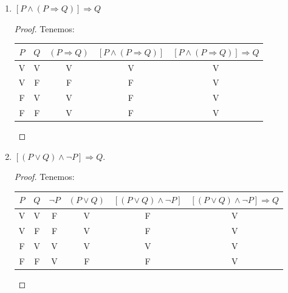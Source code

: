 \begin{problema}[Problema 4]
\begin{enumerate}
\begin{proof}
			\end{proof}
			\item $[P \wedge(P \Rightarrow Q)] \Rightarrow Q$
			\begin{proof}
				Tenemos: 
				
				\begin{table}[H]
					\centering
					\begin{tabular}{|c|c|c|c|c|}
						\hline
						$P$ & $Q$ & $(P \Rightarrow Q)$ & $[P \wedge(P \Rightarrow Q)] $ & $[P \wedge(P \Rightarrow Q)] \Rightarrow Q$ \\ \hline
						V   & V   & V                   & V                              & V                                           \\ \hline
						V   & F   & F                   & F                              & V                                           \\ \hline
						F   & V   & V                   & F                              & V                                           \\ \hline
						F   & F   & V                   & F                              & V                                           \\ \hline
					\end{tabular}
				\end{table}
				
			\end{proof}
			\item $[(P \vee Q) \wedge \neg P] \Rightarrow Q$.
			\begin{proof}
				Tenemos: 
				\begin{table}[H]
					\centering 
					\begin{tabular}{|c|c|c|c|c|c|}
						\hline
						$P$ & $Q$ & $\neg P$ & $(P \vee Q)$ & $[(P \vee Q) \wedge \neg P]$ & $[(P \vee Q) \wedge \neg P] \Rightarrow Q$ \\ \hline
						V   & V   & F        & V            & F                            & V                                          \\ \hline
						V   & F   & F        & V            & F                            & V                                          \\ \hline
						F   & V   & V        & V            & V                            & V                                          \\ \hline
						F   & F   & V        & F            & F                            & V                                          \\ \hline
					\end{tabular}
				\end{table}
			\end{proof}
		\end{enumerate}

	\end{problema}
